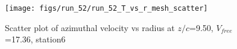 \begin{figure}[H]
\centering
\texttt{[image: figs/run\_52/run\_52\_T\_vs\_r\_mesh\_scatter]}
\caption{Scatter plot of azimuthal velocity vs radius at $z/c$=9.50, $V_{free}$=17.36, station6}
\label{fig:run_52_T_vs_r_mesh_scatter}
\end{figure}


